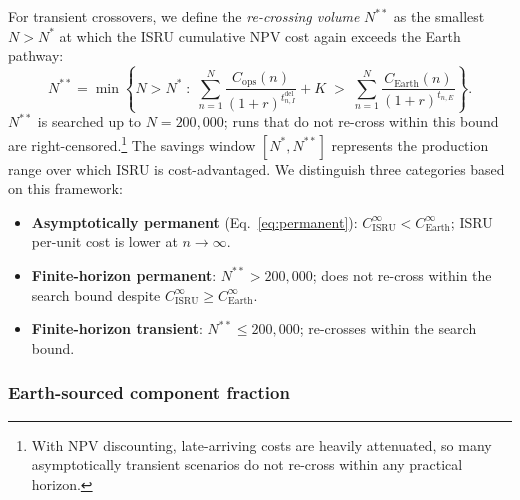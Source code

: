 \documentclass[preprint,12pt]{elsarticle}
\begin{document}
For transient crossovers, we define the \emph{re-crossing volume} $N^{**}$ as the smallest $N > N^*$ at which the ISRU cumulative NPV cost again exceeds the Earth pathway:
\begin{equation}
  N^{**} = \min\!\left\{N > N^* \;:\; \sum_{n=1}^{N} \frac{C_{\mathrm{ops}}(n)}{(1+r)^{t_{n,I}^{\mathrm{del}}}} + K \;>\; \sum_{n=1}^{N} \frac{C_{\mathrm{Earth}}(n)}{(1+r)^{t_{n,E}}}\right\}.
  \label{eq:recrossing}
\end{equation}
$N^{**}$ is searched up to $N = 200{,}000$; runs that do not re-cross within this bound are right-censored.\footnote{With NPV discounting, late-arriving costs are heavily attenuated, so many asymptotically transient scenarios do not re-cross within any practical horizon.} The savings window $[N^*, N^{**}]$ represents the production range over which ISRU is cost-advantaged. We distinguish three categories based on this framework:
\begin{itemize}
\item \textbf{Asymptotically permanent} (Eq.~\ref{eq:permanent}): $C_{\mathrm{ISRU}}^{\infty} < C_{\mathrm{Earth}}^{\infty}$; ISRU per-unit cost is lower at $n \to \infty$.
\item \textbf{Finite-horizon permanent}: $N^{**} > 200{,}000$; does not re-cross within the search bound despite $C_{\mathrm{ISRU}}^{\infty} \geq C_{\mathrm{Earth}}^{\infty}$.
\item \textbf{Finite-horizon transient}: $N^{**} \leq 200{,}000$; re-crosses within the search bound.
\end{itemize}

\subsubsection{Earth-sourced component fraction}
\label{sec:vitamin}
\end{document}
